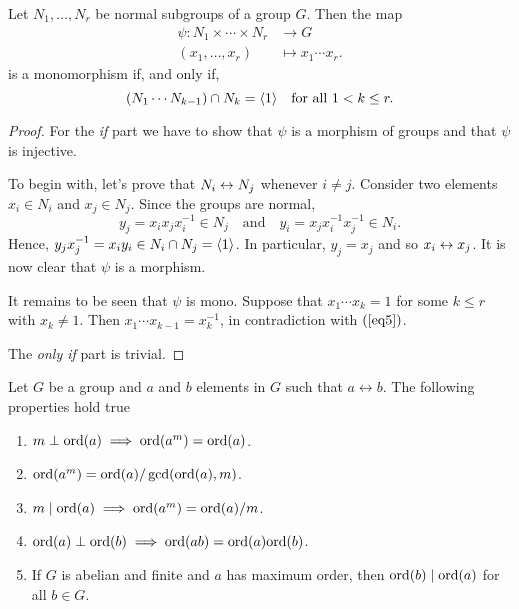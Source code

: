 \begin{thm}\label{direct-product}
    Let $N_1,\dots,N_r$ be normal subgroups of a group $G$. Then the map
    \begin{align*}
        \psi\colon N_1\times\cdots\times N_r&\to G\\
        (x_1,\dots,x_r)&\mapsto x_1\cdots x_r.
    \end{align*}
    is a monomorphism if, and only if,
    \begin{equation}\label{eq5}
        (N_1\cdots N_{k-1})\cap N_k=\langle1\rangle\quad\textrm{\rm for all }1<k\le r.  
    \end{equation}
\end{thm}


\begin{proof} 

For the \textit{if\/} part we have to show that $\psi$ is a morphism of groups and that $\psi$ is injective.

To begin with, let's prove that $N_i\mathrel\leftrightarrow N_j$ whenever $i\ne j$. Consider two elements $x_i\in N_i$ and $x_j\in N_j$. Since the groups are normal,
$$
    y_j=x_ix_jx_i^{-1}\in N_j\quad\textrm{and}\quad y_i=x_jx_i^{-1}x_j^{-1}\in N_i.
$$
Hence, $y_jx_j^{-1}=x_iy_i\in N_i\cap N_j=\langle1\rangle$. In particular, $y_j=x_j$ and so $x_i\mathrel\leftrightarrow x_j$. It is now clear that $\psi$ is a morphism.

It remains to be seen that $\psi$ is mono. Suppose that $x_1\cdots x_k=1$ for some $k\le r$ with $x_k\ne1$. Then $x_1\cdots x_{k-1}=x_k^{-1}$, in contradiction with $(\ref{eq5})$.

The \textit{only if\/} part is trivial.  \end{proof}

\begin{lem}\label{order-properties}
    Let\/ $G$ be a group and\/ $a$ and\/ $b$ elements in\/ $G$ such that $a\leftrightarrow b$. The following properties hold true
    \begin{enumerate}[\rm a)]
        \item $m\perp{\rm ord}(a)\implies{\rm ord}(a^m)={\rm ord}(a)$.
        \item ${\rm ord}(a^m)={\rm ord}(a)/\gcd({\rm ord}(a),m)$.
        \item $m\mid{\rm ord}(a)\implies{\rm ord}(a^m)={\rm ord}(a)/m$.
        \item ${\rm ord}(a)\perp{\rm ord}(b)\implies{\rm ord}(ab)={\rm ord}(a){\rm ord}(b)$.
        \item If\/ $G$ is abelian and finite and $a$ has maximum order, then\/ ${\rm ord}(b)\mid{\rm ord}(a)$ for all\/ $b\in G$.
    \end{enumerate}
\end{lem}

